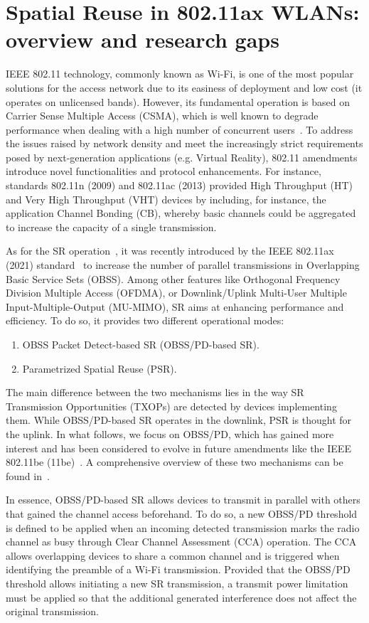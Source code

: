 \documentclass[10pt,a4paper,twocolumn]{article}
\newcommand{\ITUpar}{\vspace{8pt}\par}
\begin{document}
\section{Spatial Reuse in 802.11ax WLANs: overview and research gaps}
\label{section:spatial_reuse}

IEEE 802.11 technology, commonly known as Wi-Fi, is one of the most popular solutions for the access network due to its easiness of deployment and low cost (it operates on unlicensed bands). However, its fundamental operation is based on Carrier Sense Multiple Access (CSMA), which is well known to degrade performance when dealing with a high number of concurrent users~\cite{ziouva2002csma}. To address the issues raised by network density and meet the increasingly strict requirements posed by next-generation applications (e.g. Virtual Reality), 802.11 amendments introduce novel functionalities and protocol enhancements. For instance, standards 802.11n (2009) and 802.11ac (2013) provided High Throughput (HT) and Very High Throughput (VHT) devices by including, for instance, the application Channel Bonding (CB), whereby basic channels could be aggregated to increase the capacity of a single transmission.\ITUpar

	As for the SR operation~\cite{bib9}, it was recently introduced by the IEEE 802.11ax (2021) standard~\cite{bellalta2016ieee} to increase the number of parallel transmissions in Overlapping Basic Service Sets (OBSS). Among other features like Orthogonal Frequency Division Multiple Access (OFDMA), or Downlink/Uplink Multi-User Multiple Input-Multiple-Output (MU-MIMO), SR aims at enhancing performance and efficiency. To do so, it provides two different operational modes:
\begin{enumerate}
	\item OBSS Packet Detect-based SR (OBSS/PD-based SR).
	\item Parametrized Spatial Reuse (PSR).
\end{enumerate}

The main difference between the two mechanisms lies in the way SR Transmission Opportunities (TXOPs) are detected by devices implementing them. While OBSS/PD-based SR operates in the downlink, PSR is thought for the uplink. In what follows, we focus on OBSS/PD, which has gained more interest and has been considered to evolve in future amendments like the IEEE 802.11be (11be)~\cite{lopez2019ieee}. A comprehensive overview of these two mechanisms can be found in~\cite{bib9}.\ITUpar

In essence, OBSS/PD-based SR allows devices to transmit in parallel with others that gained the channel access beforehand. To do so, a new OBSS/PD threshold is defined to be applied when an incoming detected transmission marks the radio channel as busy through Clear Channel Assessment (CCA) operation. The CCA allows overlapping devices to share a common channel and is triggered when identifying the preamble of a Wi-Fi transmission. Provided that the OBSS/PD threshold allows initiating a new SR transmission, a transmit power limitation must be applied so that the additional generated interference does not affect the original transmission.\ITUpar
\end{document}
